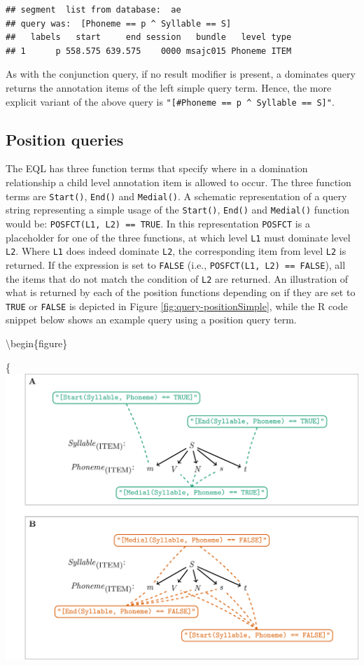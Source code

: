 \documentclass[]{book}
\begin{document}
\begin{verbatim}
## segment  list from database:  ae 
## query was:  [Phoneme == p ^ Syllable == S] 
##   labels   start     end session   bundle   level type
## 1      p 558.575 639.575    0000 msajc015 Phoneme ITEM
\end{verbatim}

As with the conjunction query, if no result modifier is present, a dominates query returns the annotation items of the left simple query term. Hence, the more explicit variant of the above query is \texttt{"{[}\#Phoneme\ ==\ p\ \^{}\ Syllable\ ==\ S{]}"}.

\hypertarget{subsec:query_positionQueries}{%
\subsection{Position queries}\label{subsec:query_positionQueries}}

The EQL has three function terms that specify where in a domination relationship a child level annotation item is allowed to occur. The three function terms are \texttt{Start()}, \texttt{End()} and \texttt{Medial()}. A schematic representation of a query string representing a simple usage of the \texttt{Start()}, \texttt{End()} and \texttt{Medial()} function would be: \texttt{POSFCT(L1,\ L2)\ ==\ TRUE}. In this representation \texttt{POSFCT} is a placeholder for one of the three functions, at which level \texttt{L1} must dominate level \texttt{L2}. Where \texttt{L1} does indeed dominate \texttt{L2}, the corresponding item from level \texttt{L2} is returned. If the expression is set to \texttt{FALSE} (i.e., \texttt{POSFCT(L1,\ L2)\ ==\ FALSE}), all the items that do not match the condition of \texttt{L2} are returned. An illustration of what is returned by each of the position functions depending on if they are set to \texttt{TRUE} or \texttt{FALSE} is depicted in Figure \ref{fig:query-positionSimple}, while the R code snippet below shows an example query using a position query term.

\textbackslash{}begin\{figure\}

\{\centering \includegraphics[width=0.75\linewidth]{pics/positionSimple}
\end{document}
